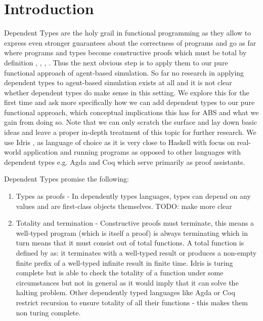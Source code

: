 \section{Introduction}

Dependent Types are the holy grail in functional programming as they allow to express even stronger guarantees about the correctness of programs and go as far where programs and types become constructive proofs \cite{wadler_propositions_2015} which must be total by definition \cite{thompson_type_1991}, \cite{altenkirch_why_2005}, \cite{altenkirch_pi_sigma:_2010}, \cite{program_homotopy_2013}. Thus the next obvious step is to apply them to our pure functional approach of agent-based simulation. So far no research in applying dependent types to agent-based simulation exists at all and it is not clear whether dependent types do make sense in this setting. We explore this for the first time and ask more specifically how we can add dependent types to our pure functional approach, which conceptual implications this has for ABS and what we gain from doing so. Note that we can only scratch the surface and lay down basic ideas and leave a proper in-depth treatment of this topic for further research. We use Idris \cite{brady_idris_2013}, \cite{brady_type-driven_2017} as language of choice as it is very close to Haskell with focus on real-world application and running programs as opposed to other languages with dependent types e.g. Agda and Coq which serve primarily as proof assistants.

Dependent Types promise the following:

\begin{enumerate}
	\item Types as proofs - In dependently types languages, types can depend on any values and are first-class objects themselves. TODO: make more clear

	\item Totality and termination - Constructive proofs must terminate, this means a well-typed program (which is itself a proof) is always terminating which in turn means that it must consist out of total functions. A total function is defined by \cite{brady_type-driven_2017} as: it terminates with a well-typed result or produces a non-empty finite prefix of a well-typed infinite result in finite time. Idris is turing complete but is able to check the totality of a function under some circumstances but not in general as it would imply that it can solve the halting problem. Other dependently typed languages like Agda or Coq restrict recursion to ensure totality of all their functions - this makes them non turing complete.
\end{enumerate}

